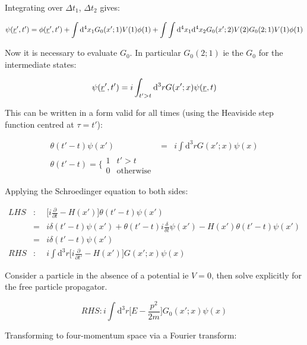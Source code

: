 Integrating over $\Delta t_1$, $\Delta t_2$ gives:

\[
  \psi(\underline{r}',t') = \phi(\underline{r}',t') + \int\mathrm{d}^4x_1 G_0(x';1)V(1)\phi(1) + \int\int\mathrm{d}^4x_1 \mathrm{d}^4x_2 G_0(x';2)V(2)G_0(2;1)V(1)\phi(1)
\]

Now it is necessary to evaluate $G_0$.  In particular $G_0(2;1)$ ie the $G_0$ for the intermediate states:

\[
  \psi(\underline{r}',t') = i\int_{t'>t} \mathrm{d}^3r G(x';x)\psi(\underline{r},t)
\]

This can be written in a form valid for all times (using the Heaviside step function centred at $\tau = t'$):

\begin{eqnarray*}
  \theta(t'-t)\psi(x') & = & i\int \mathrm{d}^3r G(x';x)\psi(x) \\
  \theta(t'-t) = \Bigg\{
    \begin{array}{cc}
    1 & t'>t \\
    0 & \textrm{otherwise}
    \end{array}
\end{eqnarray*}

Applying the Schroedinger equation to both sides:

\begin{eqnarray*}
  LHS & : & \Bigg[ i\frac{\partial}{\partial t} - H(x')\Bigg] \theta(t'-t)\psi(x') \\
  & = & i\delta(t'-t)\psi(x') + \theta(t'-t)i\frac{\delta}{\delta t}\psi(x') -H(x')\theta(t'-t)\psi(x') \\
  & = & i\delta(t'-t)\psi(x') \\
  RHS & : & i\int\mathrm{d}^3r\Bigg[ i\frac{\partial}{\partial t'} - H(x')\Bigg] G(x';x)\psi(x)
\end{eqnarray*}

Consider a particle in the absence of a potential ie $V = 0$, then solve explicitly for the free particle propagator.

\[
  RHS : i\int\mathrm{d}^3r\Bigg[ E - \frac{p^2}{2m}\Bigg] G_0(x';x)\psi(x)
\]

Transforming to four-momentum space via a Fourier transform:


